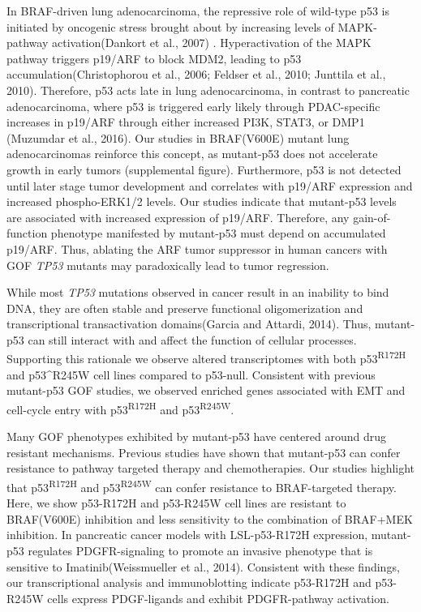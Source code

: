 In BRAF-driven lung adenocarcinoma, the repressive role of wild-type p53 is initiated by oncogenic stress brought about by increasing levels of MAPK-pathway activation(Dankort et al., 2007) . Hyperactivation of the MAPK pathway triggers p19/ARF to block MDM2, leading to p53 accumulation(Christophorou et al., 2006; Feldser et al., 2010; Junttila et al., 2010). Therefore, p53 acts late in lung adenocarcinoma, in contrast to pancreatic adenocarcinoma, where p53 is triggered early likely through PDAC-specific increases in p19/ARF through either increased PI3K, STAT3, or DMP1 (Muzumdar et al., 2016). Our studies in BRAF(V600E) mutant lung adenocarcinomas reinforce this concept, as mutant-p53 does not accelerate growth in early tumors (supplemental figure). Furthermore, p53 is not detected until later stage tumor development and correlates with p19/ARF expression and increased phospho-ERK1/2 levels. Our studies indicate that mutant-p53 levels are associated with increased expression of p19/ARF. Therefore, any gain-of-function phenotype manifested by mutant-p53 must depend on accumulated p19/ARF. Thus, ablating the ARF tumor suppressor in human cancers with GOF \emph{TP53} mutants may paradoxically lead to tumor regression.

While most \emph{TP53} mutations observed in cancer result in an inability to bind DNA, they are often stable and preserve functional oligomerization and transcriptional transactivation domains(Garcia and Attardi, 2014). Thus, mutant-p53 can still interact with and affect the function of cellular processes. Supporting this rationale we observe altered transcriptomes with both p53\textsuperscript{R172H} and p53\^{}R245W cell lines compared to p53-null. Consistent with previous mutant-p53 GOF studies, we observed enriched genes associated with EMT and cell-cycle entry with p53\textsuperscript{R172H} and p53\textsuperscript{R245W}.

Many GOF phenotypes exhibited by mutant-p53 have centered around drug resistant mechanisms. Previous studies have shown that mutant-p53 can confer resistance to pathway targeted therapy and chemotherapies. Our studies highlight that p53\textsuperscript{R172H} and p53\textsuperscript{R245W} can confer resistance to BRAF-targeted therapy. Here, we show p53-R172H and p53-R245W cell lines are resistant to BRAF(V600E) inhibition and less sensitivity to the combination of BRAF+MEK inhibition. In pancreatic cancer models with LSL-p53-R172H expression, mutant-p53 regulates PDGFR-signaling to promote an invasive phenotype that is sensitive to Imatinib(Weissmueller et al., 2014). Consistent with these findings, our transcriptional analysis and immunoblotting indicate p53-R172H and p53-R245W cells express PDGF-ligands and exhibit PDGFR-pathway activation.

